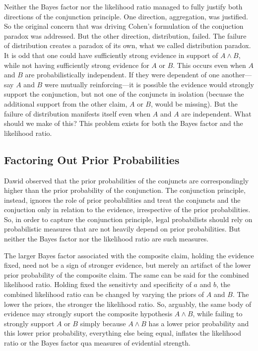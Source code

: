 \documentclass[10pt,dvipsnames,enabledeprecatedfontcommands]{scrartcl}
\begin{document}
Neither the Bayes factor nor the likelihood ratio managed to fully
justify both directions of the conjunction principle. One direction,
aggregation, was justified. So the original concern that was driving
Cohen's formulation of the conjuction paradox was addressed. But the
other direction, distribution, failed. The failure of distribution
creates a paradox of its own, what we called distribution paradox. It is
odd that one could have sufficiently strong evidence in support of
\(A\wedge B\), while not having sufficiently strong evidence for \(A\)
or \(B\). This occurs even when \(A\) and \(B\) are probabilistically
independent. If they were dependent of one another---say \(A\) and \(B\)
were mutually reinforcing---it is possible the evidence would strongly
support the conjunction, but not one of the conjuncts in isolation
(becuase the additional support from the other claim, \(A\) or \(B\),
would be missing). But the failure of distribution manifests itself even
when \(A\) and \(A\) are independent. What should we make of this? This
problem exists for both the Bayes factor and the likelihood ratio.

\hypertarget{factoring-out-prior-probabilities}{%
\subsection{Factoring Out Prior
Probabilities}\label{factoring-out-prior-probabilities}}

Dawid observed that the prior probabilities of the conjuncts are
correspondingly higher than the prior probability of the conjunction.
The conjunction principle, instead, ignores the role of prior
probabilities and treat the conjuncts and the conjuction only in
relation to the evidence, irrespective of the prior probabilities. So,
in order to capture the conjunction principle, legal probabilists should
rely on probabilistic measures that are not heavily depend on prior
probabilities. But neither the Bayes factor nor the likelihood ratio are
such measures.

The larger Bayes factor associated with the composite claim, holding the
evidence fixed, need not be a sign of stronger evidence, but merely an
artifact of the lower prior probability of the composite claim. The same
can be said for the combined likelihood ratio. Holding fixed the
sensitivty and specificity of \(a\) and \(b\), the combined likelihood
ratio can be changed by varying the priors of \(A\) and \(B\). The lower
the priors, the stronger the likelihood ratio. So, arguably, the same
body of evidence may strongly suport the composite hypothesis
\(A\wedge B\), while failing to strongly support \(A\) or \(B\) simply
because \(A\wedge B\) has a lower prior probability and this lower prior
probability, everything else being equal, inflates the likelihood ratio
or the Bayes factor qua measures of evidential strength.
\end{document}
